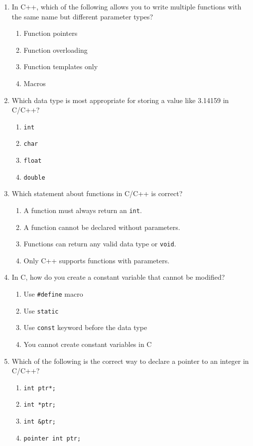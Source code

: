 \documentclass[a4paper,12pt]{article}
\begin{document}
\begin{enumerate}
    \item In C++, which of the following allows you to write multiple functions with the same name but different parameter types?
    \begin{enumerate}
        \item Function pointers
        \item Function overloading
        \item Function templates only
        \item Macros
    \end{enumerate}

    \item Which data type is most appropriate for storing a value like 3.14159 in C/C++?
    \begin{enumerate}
        \item \texttt{int}
        \item \texttt{char}
        \item \texttt{float}
        \item \texttt{double}
    \end{enumerate}

    \item Which statement about functions in C/C++ is correct?
    \begin{enumerate}
        \item A function must always return an \texttt{int}.
        \item A function cannot be declared without parameters.
        \item Functions can return any valid data type or \texttt{void}.
        \item Only C++ supports functions with parameters.
    \end{enumerate}

    \item In C, how do you create a constant variable that cannot be modified?
    \begin{enumerate}
        \item Use \texttt{\#define} macro
        \item Use \texttt{static}
        \item Use \texttt{const} keyword before the data type
        \item You cannot create constant variables in C
    \end{enumerate}

    \item Which of the following is the correct way to declare a pointer to an integer in C/C++?
    \begin{enumerate}
        \item \texttt{int ptr*;}
        \item \texttt{int *ptr;}
        \item \texttt{int \&ptr;}
        \item \texttt{pointer int ptr;}
    \end{enumerate}


\end{enumerate}
\end{document}
